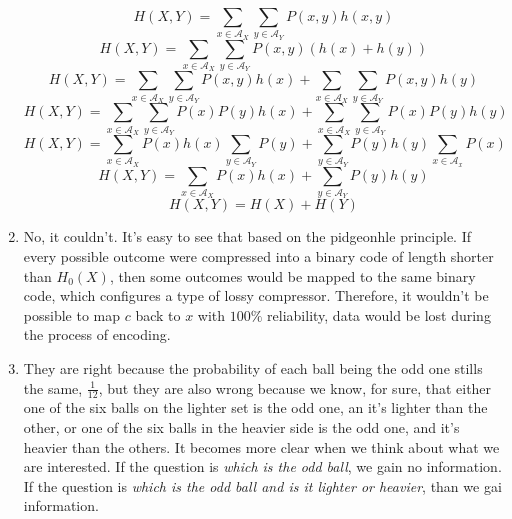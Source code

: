 \documentclass{article}
\begin{document}
\begin{enumerate}
	      \[H(X, Y) = \sum_{x \in \mathcal{A}_X} \sum_{y \in \mathcal{A}_Y} P(x, y)h(x, y)\]
	      \[H(X, Y) = \sum_{x \in \mathcal{A}_X} \sum_{y \in \mathcal{A}_Y} P(x, y)(h(x) + h(y))\]
	      \[H(X, Y) = \sum_{x \in \mathcal{A}_X} \sum_{y \in \mathcal{A}_Y} P(x, y)h(x) + \sum_{x \in \mathcal{A}_X} \sum_{y \in \mathcal{A}_Y} P(x, y)h(y)\]
	      \[H(X, Y) = \sum_{x \in \mathcal{A}_X} \sum_{y \in \mathcal{A}_Y} P(x)P(y)h(x) + \sum_{x \in \mathcal{A}_X} \sum_{y \in \mathcal{A}_Y} P(x)P(y)h(y)\]
	      \[H(X, Y) = \sum_{x \in \mathcal{A}_X} P(x)h(x) \sum_{y \in \mathcal{A}_Y} P(y) + \sum_{y \in \mathcal{A}_Y} P(y)h(y) \sum_{x \in \mathcal{A}_x} P(x)\]
	      \[H(X, Y) = \sum_{x \in \mathcal{A}_X} P(x)h(x) + \sum_{y \in \mathcal{A}_Y} P(y)h(y) \]
	      \[H(X, Y) = H(X) + H(Y)\]

	\item No, it couldn't. It's easy to see that based on the pidgeonhle principle. If every possible outcome were compressed into a binary code of length shorter than \(H_0(X)\), then some outcomes would be mapped to the same binary code, which configures a type of lossy compressor. Therefore, it wouldn't be possible to map \(c\) back to \(x\) with \(100\%\) reliability, data would be lost during the process of encoding.

	\item They are right because the probability of each ball being the odd one stills the same, \(\frac{1}{12}\), but they are also wrong because we know, for sure, that either one of the six balls on the lighter set is the odd one, an it's lighter than the other, or one of the six balls in the heavier side is the odd one, and it's heavier than the others. It becomes more clear when we think about what we are interested. If the question is \textit{which is the odd ball}, we gain no information. If the question is \textit{which is the odd ball and is it lighter or heavier}, than we gai information.

\end{enumerate}


\end{document}
